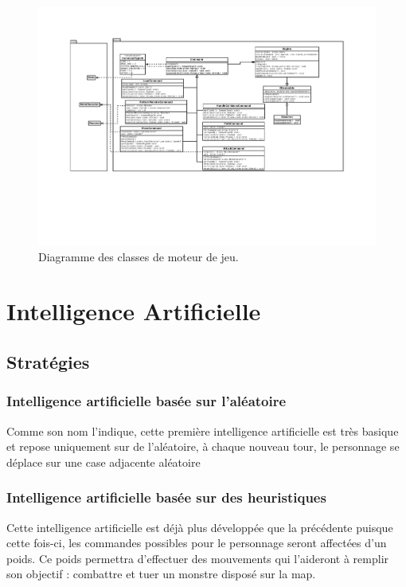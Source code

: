 \documentclass[a4paper,12pt]{article}
\begin{document}
\begin{landscape}
\begin{figure}[p]
\includegraphics[width=0.9\paperheight]{engine.pdf}
\caption{\label{engine}Diagramme des classes de moteur de jeu.} 
\end{figure}
\end{landscape}


\section{Intelligence Artificielle}

\subsection{Stratégies}

\subsubsection{Intelligence artificielle basée sur l'aléatoire}

Comme son nom l'indique, cette première intelligence artificielle est très basique et repose uniquement sur de l'aléatoire, à chaque nouveau tour, le personnage se déplace sur une case adjacente aléatoire

\subsubsection{Intelligence artificielle basée sur des heuristiques}

Cette intelligence artificielle est déjà plus développée que la précédente puisque cette fois-ci, les commandes possibles pour le personnage seront affectées d'un poids. Ce poids permettra d'effectuer des mouvements qui l'aideront à remplir son objectif : combattre et tuer un monstre disposé sur la map.
\end{document}
